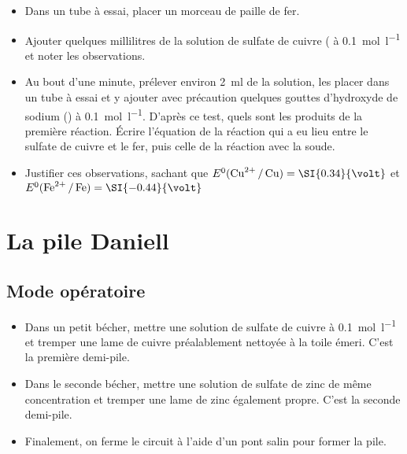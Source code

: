 \documentclass{tp}
\begin{document}
\begin{itemize}
  \item Dans un tube à essai, placer un morceau de paille de fer.
  \item Ajouter quelques millilitres de la solution de sulfate de cuivre ( à \SI{0.1}{\mol\per\litre} et noter les observations.

  \item Au bout d'une minute, prélever environ \SI{2}{\milli\litre} de la solution, les placer dans un tube à essai et y ajouter avec précaution quelques gouttes d'hydroxyde de sodium () à \SI{0.1}{\mol\per\litre}. D'après ce test, quels sont les produits de la première réaction. Écrire l'équation de la réaction qui a eu lieu entre le sulfate de cuivre et le fer, puis celle de la réaction avec la soude.

  \item Justifier ces observations, sachant que $E^0(\ce{Cu^2+ / Cu}) = \SI{0.34}{\volt} $ et $E^0(\ce{Fe^2+ / Fe})=\SI{-0.44}{\volt} $  
\end{itemize}

\section{La pile Daniell}
\label{sec:la_pile_daniell}

\subsection{Mode opératoire}
\label{sub:mode_operatoire}

\begin{itemize}
  \item Dans un petit bécher, mettre une solution de sulfate de cuivre à \SI{0.1}{\mol\per\litre} et tremper une lame de cuivre préalablement nettoyée à la toile émeri. C'est la première demi-pile.

  \item Dans le seconde bécher, mettre une solution de sulfate de zinc de même concentration et tremper une lame de zinc également propre. C'est la seconde demi-pile.

  \item Finalement, on ferme le circuit à l'aide d'un pont salin pour former la pile.
\end{itemize}
\end{document}
